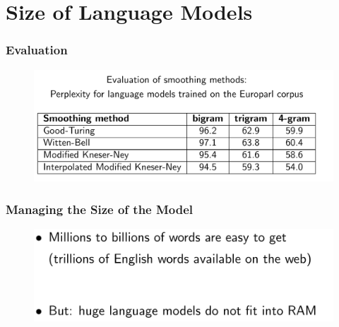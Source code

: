 \documentclass{beamer}
\begin{document}
\section{Size of Language Models}

\begin{frame}\frametitle{Evaluation}
\begin{figure}
\includegraphics[width=1\linewidth]{figure/evaluation.pdf}
\end{figure}
\end{frame}


\begin{frame}\frametitle{Managing the Size of the Model}
\begin{figure}
\includegraphics[width=0.8\linewidth]{figure/size_of_model.pdf}
\end{figure}
\end{frame}
\end{document}
